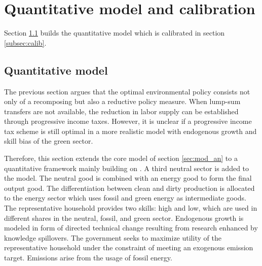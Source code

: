 \section{Quantitative model and calibration}\label{sec:model}
Section \ref{subsec:quantmod} builds the quantitative model which is calibrated in section \ref{subsec:calib}.

\subsection{Quantitative model}\label{subsec:quantmod}
The previous section argues that the optimal environmental policy consists not only of a recomposing but also a reductive policy measure. When lump-sum transfers are not available, the reduction in labor supply can be established through progressive income taxes. 
 However, it is unclear if a progressive income tax scheme is still optimal in a more realistic model with endogenous growth and skill bias of the green sector. %

Therefore, this section extends the core model of section \ref{sec:mod_an} to a quantitative framework mainly building on \cite{Fried2018ClimateAnalysis}.
A third neutral sector is added to the model. The neutral good is combined with an energy good to form  the final output good. The differentiation between clean and dirty production is allocated to the energy sector which uses fossil and green energy as intermediate goods.
The representative household provides two skills: high and low, which are used in different shares in the neutral, fossil, and green sector. 
Endogenous growth is modeled in form of directed technical change resulting from research enhanced by knowledge spillovers. The government seeks to maximize utility of the representative household under the constraint of meeting an exogenous emission target. Emissions arise from the usage of fossil energy.

